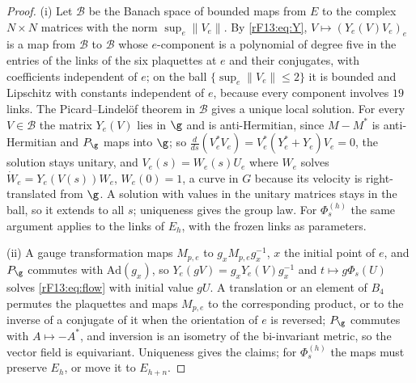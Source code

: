 \begin{proof}
(i) Let $\mathcal B$ be the Banach space of bounded maps from $E$ to the
complex $N\times N$ matrices with the norm $\sup_e\|V_e\|$. By
\eqref{rF13:eq:Y}, $V\mapsto(Y_e(V)V_e)_e$ is a map from $\mathcal B$ to
$\mathcal B$ whose $e$-component is a polynomial of degree five in the
entries of the links of the six plaquettes at $e$ and their conjugates,
with coefficients independent of $e$; on the ball $\{\sup_e\|V_e\|\le2\}$
it is bounded and Lipschitz with constants independent of $e$, because
every component involves $19$ links. The Picard--Lindel\"of theorem in
$\mathcal B$ gives a unique local solution. For every $V\in\mathcal B$ the
matrix $Y_e(V)$ lies in $\g$ and is anti-Hermitian, since $M-M^*$ is
anti-Hermitian and $P_\g$ maps into $\g$; so $\frac d{ds}(V_e^*V_e)=V_e^*
(Y_e^*+Y_e)V_e=0$, the solution stays unitary, and $V_e(s)=W_e(s)U_e$ where
$W_e$ solves $\dot W_e=Y_e(V(s))W_e$, $W_e(0)=1$, a curve in $G$ because its
velocity is right-translated from $\g$. A solution with values in the
unitary matrices stays in the ball, so it extends to all $s$; uniqueness
gives the group law. For $\Phi^{(h)}_s$ the same argument applies to the
links of $E_h$, with the frozen links as parameters.

(ii) A gauge transformation maps $M_{p,e}$ to $g_xM_{p,e}g_x^{-1}$, $x$ the
initial point of $e$, and $P_\g$ commutes with $\mathrm{Ad}(g_x)$, so
$Y_e(gV)=g_xY_e(V)g_x^{-1}$ and $t\mapsto g\Phi_s(U)$ solves
\eqref{rF13:eq:flow} with initial value $gU$. A translation or an element
of $B_4$ permutes the plaquettes and maps $M_{p,e}$ to the corresponding
product, or to the inverse of a conjugate of it when the orientation of $e$
is reversed; $P_\g$ commutes with $A\mapsto-A^*$, and inversion is an
isometry of the bi-invariant metric, so the vector field is equivariant.
Uniqueness gives the claims; for $\Phi^{(h)}_s$ the maps must preserve
$E_h$, or move it to $E_{h+n}$.


\end{proof}
